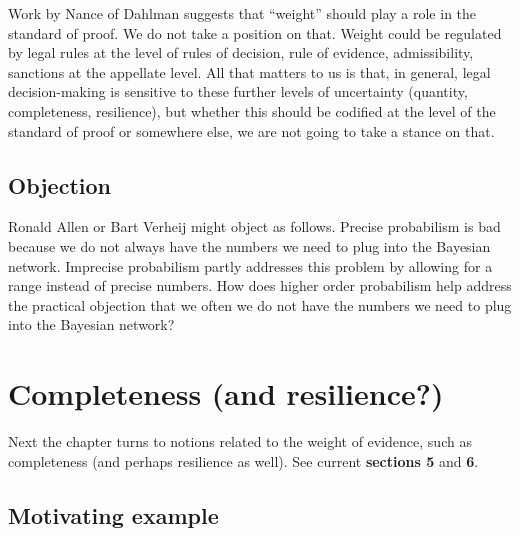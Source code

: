 \documentclass[
  10pt,
  dvipsnames,enabledeprecatedfontcommands]{scrartcl}
\begin{document}
Work by Nance of Dahlman suggests that ``weight'' should play a role in
the standard of proof. We do not take a position on that. Weight could
be regulated by legal rules at the level of rules of decision, rule of
evidence, admissibility, sanctions at the appellate level. All that
matters to us is that, in general, legal decision-making is sensitive to
these further levels of uncertainty (quantity, completeness,
resilience), but whether this should be codified at the level of the
standard of proof or somewhere else, we are not going to take a stance
on that.

\hypertarget{objection}{%
\subsection{Objection}\label{objection}}

Ronald Allen or Bart Verheij might object as follows. Precise
probabilism is bad because we do not always have the numbers we need to
plug into the Bayesian network. Imprecise probabilism partly addresses
this problem by allowing for a range instead of precise numbers. How
does higher order probabilism help address the practical objection that
we often we do not have the numbers we need to plug into the Bayesian
network?

\hypertarget{completeness-and-resilience}{%
\section{Completeness (and
resilience?)}\label{completeness-and-resilience}}

Next the chapter turns to notions related to the weight of evidence,
such as completeness (and perhaps resilience as well). See current
\textbf{sections 5} and \textbf{6}.

\hypertarget{motivating-example}{%
\subsection{Motivating example}\label{motivating-example}}
\end{document}
